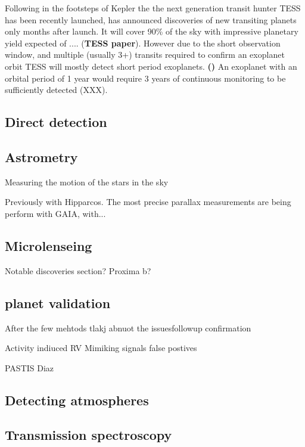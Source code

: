 Following in the footsteps of Kepler the the next generation transit hunter TESS has been recently launched, has announced discoveries of new transiting planets only months after launch.
It will cover 90\% of the sky with impressive planetary yield expected of 
.... (\textbf{TESS paper}).
However due to the short observation window, and multiple (usually 3+) transits required to confirm an exoplanet orbit TESS will mostly detect short period exoplanets.\textbf{ ()}
An exoplanet with an orbital period of 1 year would require 3 years of continuous monitoring to be sufficiently detected (XXX).



\subsection{Direct detection}

\subsection{Astrometry}

Measuring the motion of the stars in the sky

Previously with Hipparcos.
The most precise parallax measurements are being perform with GAIA, with...


\subsection{Microlenseing}


Notable discoveries section? Proxima b?  


\subsection{planet validation}
After the few mehtods tlakj abnuot the issuesfollowup confirmation

Activity indiuced RV
Mimiking signals false postives

PASTIS Diaz



\subsection{Detecting atmospheres}

\subsection{Transmission spectroscopy}

